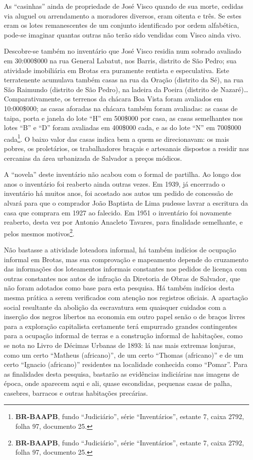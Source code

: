 As ``casinhas'' ainda de propriedade de José Visco quando de sua morte, cedidas via aluguel ou arrendamento a moradores diversos, eram oitenta e três. Se estes eram os lotes remanescentes de um conjunto identificado por ordem alfabética, pode-se imaginar quantas outras não terão sido vendidas com Visco ainda vivo.

Descobre-se também no inventário que José Visco residia num sobrado avaliado em 30:000\$000 na rua General Labatut, nos Barris, distrito de São Pedro; sua atividade imobiliária em Brotas era puramente rentista e especulativa. Este terratenente acumulava também casas na rua da Oração (distrito da Sé), na rua São Raimundo (distrito de São Pedro), na ladeira da Poeira (distrito de Nazaré)\dots Comparativamente, os terrenos da chácara Boa Vista foram avaliados em 10:000\$000; as casas aforadas na chácara também foram avaliadas: as casas de taipa, porta e janela do lote ``H'' em 500\$000 por casa, as casas semelhantes nos lotes ``B'' e ``D'' foram avaliadas em 400\$000 cada, e as do lote ``N'' em 700\$000 cada\footnote{\textbf{BR-BAAPB}, fundo ``Judiciário'', série ``Inventários'', estante 7, caixa 2792, folha 97, documento 25.}. O baixo valor das casas indica bem a quem se direcionavam: os mais pobres, os proletários, os trabalhadores braçais e artesanais dispostos a residir nas cercanias da área urbanizada de Salvador a preços módicos.

A ``novela'' deste inventário não acabou com o formal de partilha. Ao longo dos anos o inventário foi reaberto ainda outras vezes. Em 1939, já encerrado o inventário há muitos anos, foi acostado aos autos um pedido de concessão de alvará para que o comprador João Baptista de Lima pudesse lavrar a escritura da casa que comprara em 1927 ao falecido. Em 1951 o inventário foi novamente reaberto, desta vez por Antonio Anacleto Tavares, para finalidade semelhante, e pelos mesmos motivos\footnote{\textbf{BR-BAAPB}, fundo ``Judiciário'', série ``Inventários'', estante 7, caixa 2792, folha 97, documento 25.}.

Não bastasse a atividade loteadora informal, há também indícios de ocupação informal em Brotas, mas sua comprovação e mapeamento depende do cruzamento das informações dos loteamentos informais constantes nos pedidos de licença com outras constantes nos autos de infração da Diretoria de Obras de Salvador, que não foram adotados como base para esta pesquisa. Há também indícios desta mesma prática a serem verificados com atenção nos registros oficiais. A apartação social resultante da abolição da escravatura sem quaisquer cuidados com a inserção dos negros libertos na economia em outro papel senão o de braços livres para a exploração capitalista certamente terá empurrado grandes contingentes para a ocupação informal de terras e a construção informal de habitações, como se nota no Livro de Décimas Urbanas de 1893: lá nas mais extremas lonjuras, como um certo ``Matheus (africano)'', de um certo ``Thomas (africano)'' e de um certo ``Ignacio (africano)'' residentes na localidade conhecida como ``Pomar''. Para as finalidades desta pesquisa, bastarão as evidências indiciárias nas imagens de época, onde aparecem aqui e ali, quase escondidas, pequenas casas de palha, casebres, barracos e outras habitações precárias.

